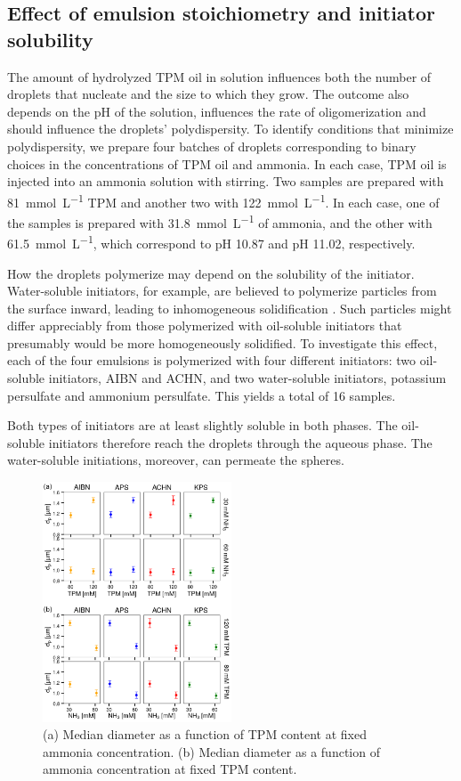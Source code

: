 \documentclass[journal=langd5,manuscript=article]{achemso}
\begin{document}
\subsection{Effect of emulsion stoichiometry and
initiator solubility}
\label{sec:stoichiometry}

The amount of hydrolyzed 
TPM oil in solution influences both
the number of droplets that nucleate and
the size to which they grow.
The outcome also depends on the pH of the solution,
influences the rate of oligomerization and should
influence the droplets' polydispersity.
To identify conditions that minimize polydispersity,
we prepare four batches of droplets
corresponding to binary choices in the
concentrations of TPM oil and ammonia.
In each case, TPM oil is injected into an ammonia solution
with stirring.
Two samples are prepared with \SI{81}{\milli\mole\per\liter}
TPM and another two with \SI{122}{\milli\mole\per\liter}.
In each case, one of the samples is prepared 
with \SI{31.8}{\milli\mole\per\liter} of ammonia,
and the other with \SI{61.5}{\milli\mole\per\liter}, which
correspond to pH \num{10.87} and pH \num{11.02}, respectively.

How the droplets polymerize may depend on the
solubility of the initiator.
Water-soluble initiators, for example, are believed
to polymerize particles from the surface inward,
leading to inhomogeneous solidification \cite{sacanna11}.
Such particles might differ appreciably from
those polymerized with oil-soluble initiators
that presumably would be more homogeneously solidified.
To investigate this effect, each of the four
emulsions is polymerized with four different initiators:
two oil-soluble initiators, AIBN and ACHN,
and two water-soluble  initiators, potassium persulfate 
and ammonium persulfate.
This yields a total of \num{16} samples.

Both types of initiators are at least slightly soluble in
both phases.  The oil-soluble initiators therefore reach the
droplets through the aqueous phase.  The water-soluble
initiations, moreover, can permeate the spheres.

\begin{figure}[!t]
  \centering
  \includegraphics[width=0.5\textwidth]{longitudinal_summary_02}
  \caption{
    (a) Median diameter as a function of TPM content
    at fixed ammonia concentration.
    (b) Median diameter as a function of ammonia
    concentration at fixed TPM content.}
  \label{fig:choices}
\end{figure}
\end{document}
